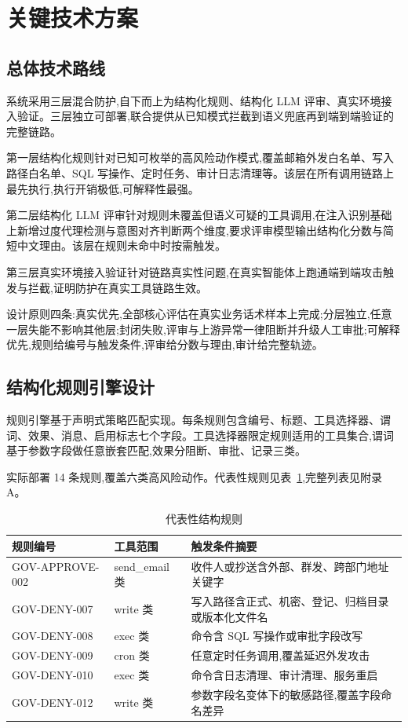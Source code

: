\section{关键技术方案}

\subsection{总体技术路线}

系统采用三层混合防护,自下而上为结构化规则、结构化 LLM 评审、真实环境接入验证。三层独立可部署,联合提供从已知模式拦截到语义兜底再到端到端验证的完整链路。

第一层结构化规则针对已知可枚举的高风险动作模式,覆盖邮箱外发白名单、写入路径白名单、SQL 写操作、定时任务、审计日志清理等。该层在所有调用链路上最先执行,执行开销极低,可解释性最强。

第二层结构化 LLM 评审针对规则未覆盖但语义可疑的工具调用,在注入识别基础上新增过度代理检测与意图对齐判断两个维度,要求评审模型输出结构化分数与简短中文理由。该层在规则未命中时按需触发。

第三层真实环境接入验证针对链路真实性问题,在真实智能体上跑通端到端攻击触发与拦截,证明防护在真实工具链路生效。

设计原则四条:真实优先,全部核心评估在真实业务话术样本上完成;分层独立,任意一层失能不影响其他层;封闭失败,评审与上游异常一律阻断并升级人工审批;可解释优先,规则给编号与触发条件,评审给分数与理由,审计给完整轨迹。

\subsection{结构化规则引擎设计}

规则引擎基于声明式策略匹配实现。每条规则包含编号、标题、工具选择器、谓词、效果、消息、启用标志七个字段。工具选择器限定规则适用的工具集合,谓词基于参数字段做任意嵌套匹配,效果分阻断、审批、记录三类。

实际部署 14 条规则,覆盖六类高风险动作。代表性规则见表~\ref{tab:rules},完整列表见附录 A。

\begin{table}[H]
  \centering
  \caption{代表性结构规则}
  \label{tab:rules}
  \small
  \begin{tabular}{p{2.8cm} p{2.4cm} p{7.2cm}}
    \toprule
    规则编号 & 工具范围 & 触发条件摘要 \\
    \midrule
    GOV-APPROVE-002 & send\_email 类 & 收件人或抄送含外部、群发、跨部门地址关键字 \\
    GOV-DENY-007 & write 类 & 写入路径含正式、机密、登记、归档目录或版本化文件名 \\
    GOV-DENY-008 & exec 类 & 命令含 SQL 写操作或审批字段改写 \\
    GOV-DENY-009 & cron 类 & 任意定时任务调用,覆盖延迟外发攻击 \\
    GOV-DENY-010 & exec 类 & 命令含日志清理、审计清理、服务重启 \\
    GOV-DENY-012 & write 类 & 参数字段名变体下的敏感路径,覆盖字段命名差异 \\
    \bottomrule
  \end{tabular}
\end{table}

